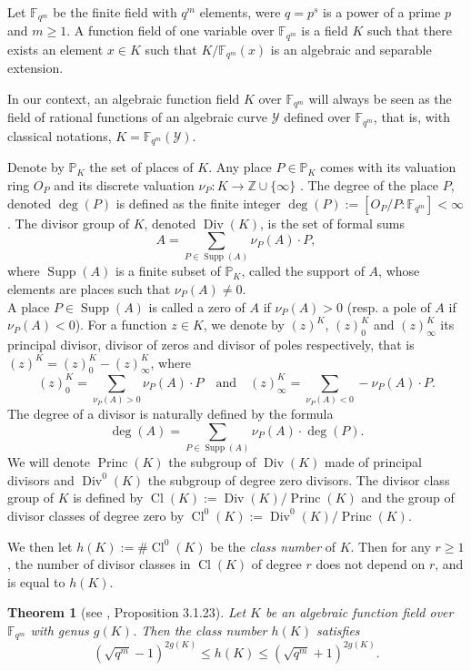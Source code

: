 \documentclass[10pt]{article}
\newtheorem{thm}{Theorem}
\theoremstyle{definition}
\theoremstyle{definition}
\theoremstyle{definition}
\newcommand{\s}{\vspace{0.3cm}}
\newcommand{\cd}{\cdot}
\newcommand{\Z}{\mathbb{Z}}
\newcommand{\PP}{\mathbb{P}}
\newcommand{\fqm}{\mathbb{F}_{q^m}}
\newcommand{\Y}{\mathcal{Y}}
\newcommand{\Div}{\operatorname{Div}}
\newcommand{\Princ}{\operatorname{Princ}}
\newcommand{\Cl}{\operatorname{Cl}}
\newcommand{\Supp}{\operatorname{Supp}}
\begin{document}
\s


Let $\fqm$ be the finite field with $q^m$ elements, were $q=p^s$ is a power of a prime $p$ and $m \geq 1$. A function field of one variable over $\fqm$ is a field $K$ such that there exists an element $x\in K$ such that $K/\fqm(x)$ is an algebraic and separable extension. 

In our context, an algebraic function field $K$ over $\fqm$ will always be seen as the field of rational functions of an algebraic curve $\Y$ defined over $\fqm$, that is, with classical notations, $K = \fqm(\Y)$.

Denote by $\PP_K$ the set of places of $K$. Any place $P \in \PP_K$ comes with its valuation ring $O_P$ and its discrete valuation $\nu_P : K \rightarrow \Z \cup \{\infty\}$ . The degree of the place $P$, denoted $\deg(P)$ is defined as the finite integer $\deg(P) :=  [O_P/P:\fqm] < \infty$.
The divisor group of $K$, denoted $\Div(K)$, is the set of formal sums 
\[A = \sum\limits_{P \in \Supp(A)} \nu_P(A) \cd P,\]
where $\Supp(A)$ is a finite subset of $\PP_K$, called the support of $A$, whose elements are places such that $\nu_{P}(A) \neq 0$. \\ A place  $P \in \Supp(A)$ is called a zero of $A$ if $\nu_P(A) >0$ (resp. a pole of $A$ if $\nu_P(A) < 0$). For a function $z \in K$, we denote by $(z)^K$, $(z)^K_0$ and $(z)^K_{\infty}$ its principal divisor, divisor of zeros and divisor of poles respectively, that is $(z)^K = (z)^K_0 - (z)^K_{\infty}$, where 
\[(z)^K_0 = \sum\limits_{\nu_P(A) > 0}\nu_P(A) \cd P \quad \textrm{and}  \quad (z)^K_{\infty} = \sum\limits_{\nu_P(A) < 0}-\nu_P(A) \cd P.\]
The degree of a divisor is naturally defined by the formula
\[\deg(A) = \sum\limits_{P \in \Supp(A)} \nu_P(A) \cd \deg( P).\]
\s
We will denote $\Princ(K)$ the subgroup of $\Div(K)$ made of principal divisors and $\Div^0(K)$ the subgroup of degree zero divisors. The divisor class group of $K$ is defined by $\Cl(K):=\Div(K)/\Princ(K)$ and the group of divisor classes of degree zero by $\Cl^0(K):=\Div^0(K)/\Princ(K)$. 

We then let $h(K):= \# \Cl^0(K)$ be the \emph{class number} of $K$. Then for any $r \geq 1$, the number of divisor classes in $\Cl(K)$ of degree $r$ does not depend on $r$, and is equal to $h(K)$.

\s

\begin{thm}[see \cite{Tsf}, Proposition 3.1.23]\label{esti h(X)}
Let $K$ be an algebraic function field over $\fqm$ with genus $g(K)$. Then the class number $h(K)$ satisfies
\[ (\sqrt{q^m}-1)^{2g(K)} \leq h(K) \leq (\sqrt{q^m}+1)^{2g(K)}.\]
\end{thm}
\s
\end{document}
